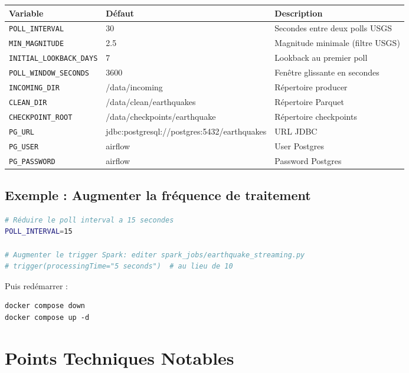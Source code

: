 \documentclass[12pt, a4paper]{article}
\begin{document}
\begin{table}[h]
\centering
\small
\begin{tabular}{|l|l|l|}
\toprule
\textbf{Variable} & \textbf{Défaut} & \textbf{Description} \\
\midrule
\texttt{POLL\_INTERVAL} & 30 & Secondes entre deux polls USGS \\
\texttt{MIN\_MAGNITUDE} & 2.5 & Magnitude minimale (filtre USGS) \\
\texttt{INITIAL\_LOOKBACK\_DAYS} & 7 & Lookback au premier poll \\
\texttt{POLL\_WINDOW\_SECONDS} & 3600 & Fenêtre glissante en secondes \\
\midrule
\texttt{INCOMING\_DIR} & /data/incoming & Répertoire producer \\
\texttt{CLEAN\_DIR} & /data/clean/earthquakes & Répertoire Parquet \\
\texttt{CHECKPOINT\_ROOT} & /data/checkpoints/earthquake & Répertoire checkpoints \\
\midrule
\texttt{PG\_URL} & jdbc:postgresql://postgres:5432/earthquakes & URL JDBC \\
\texttt{PG\_USER} & airflow & User Postgres \\
\texttt{PG\_PASSWORD} & airflow & Password Postgres \\
\bottomrule
\end{tabular}
\end{table}

\subsection{Exemple : Augmenter la fréquence de traitement}

\begin{lstlisting}[caption=Éditer .env.airflow, language=bash]
# Réduire le poll interval a 15 secondes
POLL_INTERVAL=15

# Augmenter le trigger Spark: editer spark_jobs/earthquake_streaming.py
# trigger(processingTime="5 seconds")  # au lieu de 10
\end{lstlisting}

Puis redémarrer :

\begin{lstlisting}
docker compose down
docker compose up -d
\end{lstlisting}

\section{Points Techniques Notables}
\end{document}
